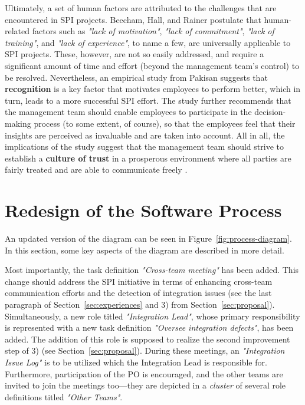 \documentclass[conference]{IEEEtran}
\begin{document}
Ultimately, a set of human factors are attributed to the challenges that are
encountered in SPI projects. Beecham, Hall, and Rainer \cite{Beecham2003}
postulate that human-related factors such as \textit{"lack of motivation"},
\textit{"lack of commitment"}, \textit{"lack of training"}, and \textit{"lack
of experience"}, to name a few, are universally applicable to SPI projects.
These, however, are not so easily addressed, and require a significant amount
of time and effort (beyond the management team's control) to be resolved.
Nevertheless, an empirical study from Pakisan \cite{Danish2010} suggests that
\textbf{recognition} is a key factor that motivates employees to perform better,
which in turn, leads to a more successful SPI effort. The study further
recommends that the management team should enable employees to participate in
the decision-making process (to some extent, of course), so that the employees
feel that their insights are perceived as invaluable and are taken into
account. All in all, the implications of the study suggest that the management
team should strive to establish a \textbf{culture of trust} in a prosperous
environment where all parties are fairly treated and are able to communicate
freely \cite{Danish2010}.

\section{Redesign of the Software Process}
\label{sec:redesign}

An updated version of the diagram can be seen in
Figure~\ref{fig:process-diagram}. In this section, some key aspects of the
diagram are described in more detail.

Most importantly, the task definition \textit{"Cross-team meeting"} has been
added. This change should address the SPI initiative in terms of enhancing
cross-team communication efforts and the detection of integration issues (see
the last paragraph of Section~\ref{sec:experiences} and 3) from
Section~\ref{sec:proposal}). Simultaneously, a new role titled
\textit{"Integration Lead"}, whose primary responsibility is represented with a
new task definition \textit{"Oversee integration defects"}, has been added. The
addition of this role is supposed to realize the second improvement step of 3)
(see Section~\ref{sec:proposal}). During these meetings, an
\textit{"Integration Issue Log"} is to be utilized which the Integration Lead
is responsible for. Furthermore, participation of the PO is encouraged, and the
other teams are invited to join the meetings too---they are depicted in a
\textit{cluster} of several role definitions titled \textit{"Other Teams"}.
\end{document}
